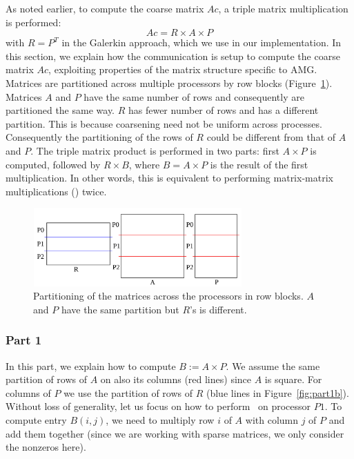 As noted earlier, to compute the coarse matrix $Ac$, a triple matrix multiplication is performed:
\begin{equation}
 Ac = R \times A \times P
\end{equation}
with $R = P^T$ in the Galerkin approach, which we use in our implementation.
%
In this section, we explain how the communication is setup to compute the coarse matrix $Ac$, exploiting properties of the matrix structure specific to AMG. 
%
Matrices are partitioned across multiple processors by row blocks (Figure~\ref{fig:partition}). Matrices $A$ and $P$ have the same number of rows and consequently are partitioned the same way. $R$ has fewer number of rows and has a different partition. This is because coarsening need not be uniform across processes. Consequently the partitioning of the rows of $R$ could be different from that of $A$ and $P$. The triple matrix product is performed in two parts: first $A \times P$ is computed, followed by $R \times B$, where $B = A \times P$ is the result of the first multiplication. In other words, this is equivalent to performing matrix-matrix multiplications (\mm) twice.

\begin{figure}[tbh]
 \centering
 \includegraphics[width=8cm,height=3cm]{./figures/partition.pdf}
 \caption{Partitioning of the matrices across the processors in row blocks. $A$ and $P$ have the same partition but $R$'s is different.}
 \label{fig:partition}
\end{figure}

\subsubsection{Part 1}

In this part, we explain how to compute $B := A \times P$. We assume the same partition of rows of $A$ on also its columns (red lines) since $A$ is square. For columns of $P$ we use the partition of rows of $R$ (blue lines in Figure~\ref{fig:part1b}).
Without loss of generality, let us focus on how to perform \mm ~on processor $P1$. To compute entry $B(i, j)$, we need to multiply row $i$ of $A$ with column $j$ of $P$ and add them together (since we are working with sparse matrices, we only consider the nonzeros here).

